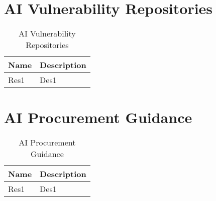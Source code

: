\clearpage
\section{AI Vulnerability Repositories}

\begin{table}[h]
\begin{tabularx}{\textwidth} {
  | >{\raggedright\arraybackslash}X
  | >{\raggedright\arraybackslash}X | }
 \hline
    \textbf{Name} & \textbf{Description}   \\
    \hline
    Res1 & Des1   \\
    \hline
\end{tabularx}
\caption{AI Vulnerability Repositories}
\label{tab:team}
\end{table}

\clearpage
\section{AI Procurement Guidance}

\begin{table}[h]
\begin{tabularx}{\textwidth} {
  | >{\raggedright\arraybackslash}X
  | >{\raggedright\arraybackslash}X | }
 \hline
    \textbf{Name} & \textbf{Description}   \\
    \hline
    Res1 & Des1   \\
    \hline
\end{tabularx}
\caption{AI Procurement Guidance}
\label{tab:team}
\end{table}
